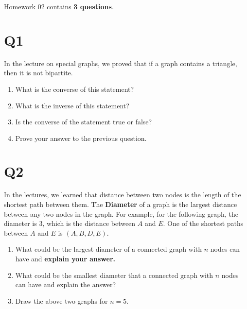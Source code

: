\documentclass[12pt]{exam}
\begin{document}
Homework 02 contains \textbf{3 questions}.

\section{Q1}
In the lecture on special graphs, we proved that if a graph contains a triangle, then it is not bipartite.
\begin{enumerate}
    \item What is the converse of this statement?
    \item What is the inverse of this statement?
    \item Is the converse of the statement true or false?
    \item Prove your answer to the previous question.
\end{enumerate}

\section{Q2} 
In the lectures, we learned that distance between two nodes is the length of the shortest path between them. The \textbf{Diameter} of a graph is the largest distance between any two nodes in the graph. For example, for the following graph, the diameter is $3$, which is the distance between $A$ and $E$. One of the shortest paths between $A$ and $E$ is $(A, B, D, E)$.


\begin{enumerate}
    \item What could be the largest diameter of a connected graph with $n$ nodes can have and \textbf{explain your answer.}
    \item What could be the smallest diameter that a connected graph with $n$ nodes can have and explain the answer?
    \item Draw the above two graphs for $n = 5$.
\end{enumerate}
\end{document}
